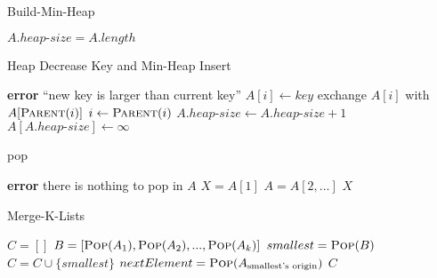 \documentclass{article}
\begin{document}
\begin{algorithm}
\caption{Build-Min-Heap}
\begin{algorithmic}[1]
    \State $A.heap\text{-}size = A.length$
        \State {}
    \EndFor
\EndFunction {}
\end{algorithmic}
\end{algorithm}

\begin{algorithm}
\caption{Heap Decrease Key and Min-Heap Insert}
\begin{algorithmic}[1]
        \State \textbf{error} ``new key is larger than current key''
    \EndIf
    \State $A[i] \gets key$
        \State exchange $A[i]$ with $A[\Call{Parent}{i}]$
        \State $i \gets \Call{Parent}{i}$
    \EndWhile
\EndFunction {}
\Statex
{}
    \State $A.heap\text{-}size \gets A.heap\text{-}size + 1$
    \State $A[A.heap\text{-}size] \gets \infty$
    \State {}
\EndFunction {}
\end{algorithmic}
\end{algorithm}


\begin{algorithm}
\caption{pop}
\begin{algorithmic}[1]
        \State \textbf{error} there is nothing to pop in $A$
    \EndIf
    \State $X = A[1]$
    \State $A = A[2,...]$
    \State \Return $X$
\EndFunction {}
\end{algorithmic}
\end{algorithm}

\begin{algorithm}
\caption{Merge-K-Lists}
\begin{algorithmic}[1]
    \State $C = []$ 
    \State $B = [\Call{Pop}{A_1}, \Call{Pop}{A_2},..., \Call{Pop}{A_k}]$ 
    \State {} 
     
        \State $smallest = \Call{Pop}{B}$ 
        \State $C = C\cup \{smallest\} $ 
            \State $nextElement = \Call{Pop}{A_{\text{smallest's origin}}}$ 
            \State {} 
        \EndIf
    \EndWhile
    \State \Return $C$ 
\EndFunction
\end{algorithmic}
\end{algorithm}
\end{document}
